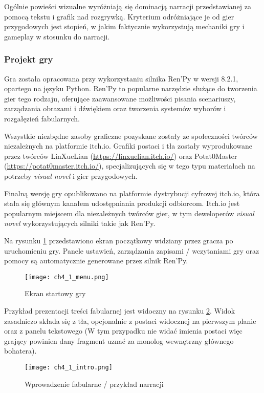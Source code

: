 Ogólnie powieści wizualne wyróżniają się dominacją narracji przedstawianej za pomocą tekstu i grafik nad
rozgrywką. Kryterium odróżniające je od gier przygodowych jest stopień, w jakim faktycznie
wykorzystują mechaniki gry i gameplay w stosunku do narracji\cite{tvtropes_visual_novel}.

\subsubsection*{Projekt gry}

Gra została opracowana przy wykorzystaniu silnika Ren'Py w wersji 8.2.1, opartego na języku Python.
Ren'Py to popularne narzędzie służące do tworzenia gier tego rodzaju, oferujące zaawansowane
możliwości pisania scenariuszy, zarządzania obrazami i dźwiękiem oraz tworzenia systemów wyborów
i rozgałęzień fabularnych.

Wszystkie niezbędne zasoby graficzne pozyskane zostały ze społeczności twórców niezależnych na
platformie itch.io. Grafiki postaci i tła zostały wyprodukowane przez twórców
LinXueLian (\url{https://linxuelian.itch.io/}) oraz Potat0Master (\url{https://potat0master.itch.io/}),
specjalizujących się w tego typu materiałach na potrzeby \textit{visual novel} i gier przygodowych.

Finalną wersję gry opublikowano na platformie dystrybucji cyfrowej itch.io, która stała się
głównym kanałem udostępniania produkcji odbiorcom. Itch.io jest popularnym miejscem dla niezależnych
twórców gier, w tym deweloperów \textit{visual novel} wykorzystujących silniki takie jak Ren'Py.

Na rysunku \ref{fig:ch4_1_menu} przedstawiono ekran początkowy widziany przez gracza po uruchomieniu
gry. Panele ustawień, zarządzania zapisami / wczytaniami gry oraz pomocy są automatycznie generowane
przez silnik Ren'Py.

\begin{figure}[h!]
    \centering
    \texttt{[image: ch4\_1\_menu.png]}
    \caption{Ekran startowy gry}
    \label{fig:ch4_1_menu}
\end{figure}

\newpage
Przykład prezentacji treści fabularnej jest widoczny na rysunku \ref{fig:ch4_1_intro}. Widok
zasadniczo składa się z tła, opcjonalnie z postaci widocznej na pierwszym planie oraz z panelu
tekstowego (W tym przypadku nie widać imienia postaci więc grający powinien dany fragment uznać
za monolog wewnętrzny głównego bohatera).

\begin{figure}[h!]
    \centering
    \texttt{[image: ch4\_1\_intro.png]}
    \caption{Wprowadzenie fabularne / przykład narracji}
    \label{fig:ch4_1_intro}
\end{figure}

